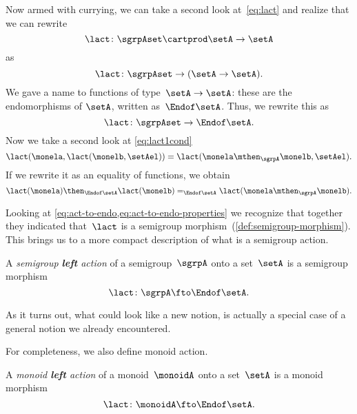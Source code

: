 Now armed with currying, we can take a second look at~\cref{eq:lact} and realize that we can rewrite
\begin{equation}\label{eq:currying-lact-1}
\lact \colon \sgrpAset \cartprod \setA \to \setA
\end{equation}
as
\begin{equation}\label{eq:currying-lact-2}
  \lact \colon \sgrpAset \to (\setA \to \setA).
\end{equation}
We gave a name to functions of type~$\setA \to \setA$: these are the endomorphisms of $\setA$, written as~$\Endof\setA$.
Thus, we rewrite this as
\begin{equation}\label{eq:act-to-endo}
  \lact \colon \sgrpAset \to \Endof\setA.
\end{equation}
Now we take a second look at \cref{eq:lact1cond}
\begin{equation}\label{eq:lact1cond-2}
  \lact(\monela, \lact(\monelb, \setAel)) = \lact(\monela \mthen_\sgrpA \monelb, \setAel).
\end{equation}
If we rewrite it as an equality of functions, we obtain
\begin{equation} \label{eq:act-to-endo-properties}
  \lact(\monela) \then_{\Endof\setA}  \lact(\monelb) =_{\Endof\setA} \lact(\monela \mthen_\sgrpA \monelb).
\end{equation}

Looking at \cref{eq:act-to-endo,eq:act-to-endo-properties} we recognize that together
they indicated that~$\lact$ is a semigroup morphism~(\cref{def:semigroup-morphism}). This brings us to a more compact description of what is a semigroup action.

\begin{ctdefinition}\label{def:semigroup-left-action}
  A \emph{semigroup \textbf{left} action} of a semigroup~$\sgrpA$ onto a set~$\setA$ is a semigroup morphism
  \begin{equation}\label{eq:act-semigroup}
    \lact \colon \sgrpA \fto \Endof\setA.
  \end{equation}
\end{ctdefinition}

As it turns out, what could look like a new notion, is actually a special case of a general notion we already encountered.

For completeness, we also define monoid action.

\begin{ctdefinition}\label{def:monoid-left-action}
  A \emph{monoid \textbf{left} action} of a monoid~$\monoidA$ onto a set~$\setA$ is a monoid morphism
  \begin{equation}\label{eq:act-monoid}
    \lact \colon \monoidA \fto \Endof\setA.
  \end{equation}
\end{ctdefinition}


